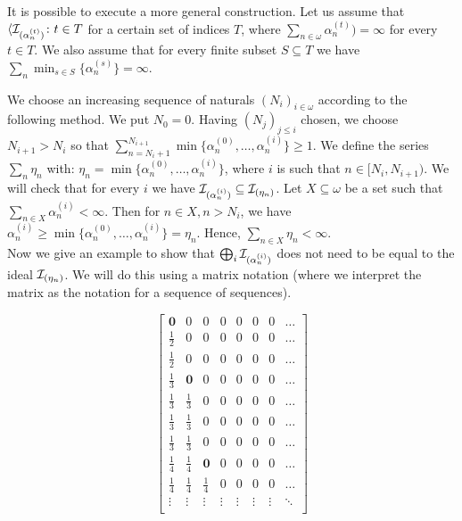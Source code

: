 \documentclass[12pt]{article}
\theoremstyle{plain}
\theoremstyle{definition}
\theoremstyle{remark}
\newcommand{\cI}{{\cal I}}
\begin{document}
It is possible to execute a more general construction. Let us assume that $\langle \cI_{(\alpha_n^{(t)})} \colon t \in T$ for a certain set of indices $T$, where $\sum_{n\in\omega}\alpha_n^{(t)}) = \infty$ for every $t\in T$. We also assume that for every finite subset $S \subseteq T$ we have $\sum_n \min_{s\in S} \{\alpha_n^{(s)}\} = \infty$.

We choose an increasing sequence of naturals $(N_i)_{i\in\omega}$ according to the following method. We put $N_0 = 0$. Having $(N_j)_{j \leq i}$ chosen, we choose $N_{i + 1} > N_{i}$ so that $\sum_{n = N_{i} + 1}^{N_{i+1}} \min\{\alpha_n^{(0)} , \ldots, \alpha_n^{(i)} \} \geq 1$. We define the series $\sum_n \eta_n$ with: $\eta_n = \min\{\alpha_n^{(0)} , \ldots, \alpha_n^{(i)}\}$, where $i$ is such that $n \in [N_i, N_{i+1})$. We will check that for every $i$ we have $\cI_{(\alpha_n^{(i)})} \subseteq \cI_{(\eta_n)}$. Let $X \subseteq \omega$ be a set such that $\sum_{n\in X} \alpha_n^{(i)} < \infty$. Then for $n\in X, n > N_i$, we have $\alpha_n^{(i)} \geq \min\{\alpha_n^{(0)} , \ldots, \alpha_n^{(i)}\} = \eta_n$. Hence, $\sum_{n\in X}\eta_n < \infty$.\\


Now we give an example to show that $\bigoplus_{i}\cI_{(\alpha_n^{(i)})}$ does not need to be equal to the ideal $\cI_{(\eta_n)}$. We will do this using a matrix notation (where we interpret the matrix as the notation for a sequence of sequences).

\[
  \begin{bmatrix}
     \mathbf{0}  &           0 & 0 & 0 & 0 & 0 & 0 & \ldots\\
    \frac{1}{2} &  0 & 0 & 0 & 0 & 0 & 0 & \ldots\\
    \frac{1}{2} & 0 & 0 & 0 & 0 & 0 & 0 & \ldots\\
    \frac{1}{3} & \mathbf{0} & 0 & 0 & 0 & 0 & 0 & \ldots\\
    \frac{1}{3} & \frac{1}{3} & 0 & 0 & 0 & 0 & 0 & \ldots\\
    \frac{1}{3} & \frac{1}{3} & 0 & 0 & 0 & 0 & 0 & \ldots\\
    \frac{1}{3} & \frac{1}{3} & 0 & 0 & 0 & 0 & 0 & \ldots\\
    \frac{1}{4} & \frac{1}{4} & \mathbf{0} & 0 & 0 & 0 & 0 & \ldots\\
    \frac{1}{4} & \frac{1}{4} & \frac{1}{4} & 0 & 0 & 0 & 0 & \ldots\\
		 \vdots     &      \vdots & \vdots & \vdots & \vdots & \vdots & \vdots & \ddots\\
  \end{bmatrix}
\]
\end{document}
